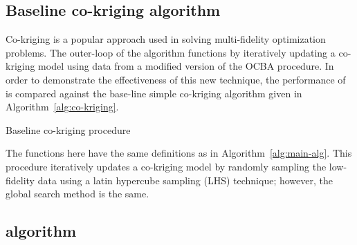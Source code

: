 \subsection{Baseline co-kriging algorithm}
Co-kriging is a popular approach used in solving multi-fidelity optimization problems. The outer-loop of the \AlgName{} algorithm functions by iteratively updating a co-kriging model using data from a modified version of the OCBA procedure. In order to demonstrate the effectiveness of this new technique, the performance of \AlgName{} is compared against the base-line simple co-kriging algorithm given in Algorithm~\ref{alg:co-kriging}.


\begin{algorithm}[h!] 
\caption{Baseline co-kriging procedure}
\label{alg:co-kriging}
{\footnotesize
\begin{algorithmic}[1]
 
  
   
     
  \ENDIF
   
   
   
   
   
\ENDWHILE
\end{algorithmic}
}
\end{algorithm}

The functions here have the same definitions as in Algorithm~\ref{alg:main-alg}. This procedure iteratively updates a co-kriging model by randomly sampling the low-fidelity data using a latin hypercube sampling (LHS) technique; however, the global search method is the same.

\subsection{\motos{} algorithm}

